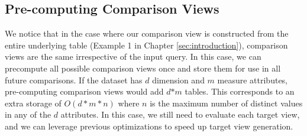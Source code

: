 % 
% 


  \subsection {Pre-computing Comparison Views}
  We notice that in the case where our comparison view is constructed from the
  entire underlying table (Example 1 in Chapter \ref{sec:introduction}),
  comparison views are the same irrespective of the input query.
  In this case, we can precompute all possible comparison views once and store
  them for use in all future comparisons. If the dataset has $d$ dimension and
  $m$ measure attributes, pre-computing comparison views would add $d$$\ast$$m$
  tables. This corresponds to an extra storage of $O(d\ast m \ast n)$ where $n$
  is the maximum number of distinct values in any of the $d$ attributes. In this
  case, we still need to evaluate each target view, and we can leverage previous
  optimizations to speed up target view generation.
  
